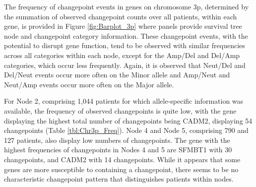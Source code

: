 The frequency of changepoint events in genes on chromosome 3p, determined by the summation of observed changepoint counts over all patients, within each gene, is provided in Figure \ref{fig:Barplot_3p} where panels provide survival tree node and changepoint category information. These changepoint events, with the potential to disrupt gene function, tend to be observed with similar frequencies across all categories within each node, except for the Amp/Del and Del/Amp categories, which occur less frequently. Again, it is observed that Neut/Del and Del/Neut events occur more often on the Minor allele and Amp/Neut and Neut/Amp events occur more often on the Major allele. 

For Node 2, comprising 1,044 patients for which allele-specific information was available, the frequency of observed changepoints is quite low, with the gene displaying the highest total number of changepoints being CADM2, displaying 54 changepoints (Table \ref{tbl:Chr3p_Freq}). Node 4 and Node 5, comprising 790 and 127 patients, also display low numbers of changepoints. The gene with the highest frequencies of changepoints in Nodes 4 and 5 are SFMBT1 with 30 changepoints, and CADM2 with 14 changepoints. While it appears that some genes are more susceptible to containing a changepoint, there seems to be no characteristic changepoint pattern that distinguishes patients within nodes.

